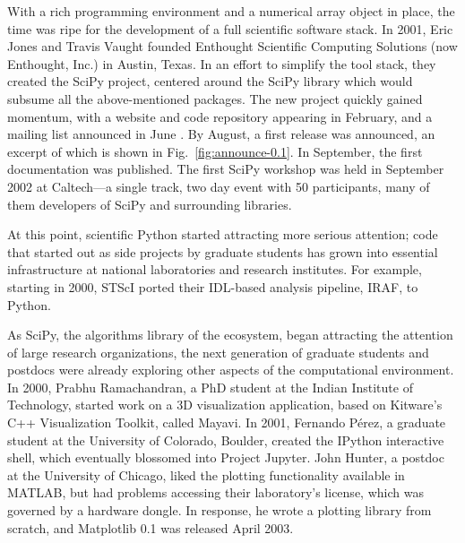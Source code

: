 \documentclass[fleqn,10pt]{wlscirep}
\begin{document}
With a rich programming environment and a numerical array object in
place, the time was ripe for the development of a full scientific
software stack.
In 2001, Eric Jones and Travis Vaught founded Enthought Scientific
Computing Solutions (now Enthought, Inc.) in Austin, Texas.  In an
effort to simplify the tool stack, they created the SciPy project,
centered around the SciPy library which would subsume all the
above-mentioned packages.
The new project quickly gained momentum, with a website and code
repository appearing in
February\cite{archived-scipyorg}, and
a mailing list announced in
June \cite{new-scipy-list}. By
August, a first release was announced\cite{first-scipy-rel}, an excerpt of which is shown in
Fig.~\ref{fig:announce-0.1}.
In September, the first documentation was
published\cite{first-scipy-docs}.
The first SciPy
workshop\cite{first-scipy-workshop}
was held in September 2002 at Caltech---a single track, two day event with 50
participants, many of them developers of SciPy and surrounding libraries.



At this point, scientific Python started attracting more serious attention;
code that started out as side projects by graduate students has grown into
essential infrastructure at national laboratories and research institutes.
For example, starting in 2000, STScI ported their IDL-based analysis pipeline,
IRAF, to Python.
 
As SciPy, the algorithms library of the ecosystem, began attracting the attention
of large research organizations,
the next generation of graduate students and postdocs were already exploring
other aspects of the computational environment.
In 2000, Prabhu Ramachandran, a PhD student at the Indian Institute of
Technology, started work on a 3D visualization application, based on
Kitware's C++ Visualization Toolkit\cite{schroeder:2006:VTK}, called
Mayavi\cite{mayavi-intro}.
In 2001, Fernando Pérez, a graduate student at the University of
Colorado, Boulder, created the IPython interactive shell, which 
eventually blossomed into Project Jupyter\cite{Kluyver:2016aa}.
John Hunter, a postdoc
at the University
of Chicago, liked the plotting functionality
available in MATLAB, but had problems accessing their laboratory's
license, which was governed by a hardware dongle.  In response, he
wrote a plotting library from scratch, and Matplotlib 0.1 was released
April 2003\cite{matplotlib-rel}.
\end{document}
